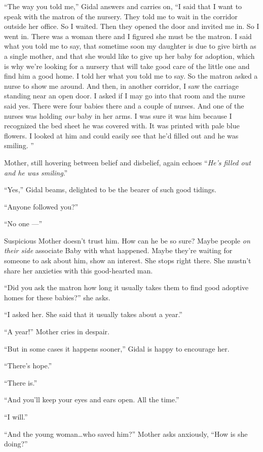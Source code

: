 \documentclass[twoside,11pt,openany]{book}
\begin{document}
``The way you told me,'' Gidal answers and carries on, ``I said that I want to
speak with the matron of the nursery. They told me to wait in the corridor outside her office. So I waited. Then they
opened the door and invited me in. So I went in. There was a woman there and I figured she must be the matron. I said
what you told me to say, that sometime soon my daughter is due to give birth as a single mother, and that she would
like to give up her baby for adoption, which is why we're looking for a nursery that will take good care of the little
one and find him a good home. I told her what you told me to say. So the matron asked a nurse to show me around.  And
then, in another corridor, I saw the carriage standing near an open door. I asked if I may go into that room and the
nurse said yes. There were four babies there and a couple of nurses. And one of the nurses was holding\textit{ our
}baby in her arms. I was sure it was him because I recognized the bed sheet he was covered with. It was printed with
pale blue flowers. I looked at him and could easily see that he'd filled out and he was smiling. ''

Mother, still hovering between belief and disbelief, again{ }echoes
``\textit{He's filled out and he was smiling}.''

``Yes,'' Gidal beams, delighted to be the bearer of such good tidings.

``Anyone followed you?''

``No one ---''

Suspicious{ }Mother doesn't trust him. How can he be so sure? Maybe people
\textit{on their side} associate Baby with what happened. Maybe they're waiting for someone to ask about him, show an
interest. She stops right there. She mustn't share her anxieties with this good-hearted man.

``Did you ask the matron how long it usually takes them to find good adoptive homes for these
babies?'' she asks.

``I asked her. She said that it usually takes about a year.''

``A year!'' Mother cries in despair.

``But in some cases it happens sooner,'' Gidal is happy to encourage her.

``There's hope.''

``There is.''

``And you'll keep your eyes and ears open. All the time.''

``I will.''

``And the young woman{\ldots}who saved him?'' Mother asks anxiously, ``How is she
doing?''
\end{document}
